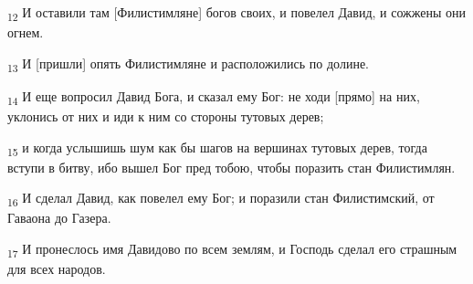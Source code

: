 \begin{tcolorbox}
\textsubscript{12} И оставили там [Филистимляне] богов своих, и повелел Давид, и сожжены они огнем.
\end{tcolorbox}
\begin{tcolorbox}
\textsubscript{13} И [пришли] опять Филистимляне и расположились по долине.
\end{tcolorbox}
\begin{tcolorbox}
\textsubscript{14} И еще вопросил Давид Бога, и сказал ему Бог: не ходи [прямо] на них, уклонись от них и иди к ним со стороны тутовых дерев;
\end{tcolorbox}
\begin{tcolorbox}
\textsubscript{15} и когда услышишь шум как бы шагов на вершинах тутовых дерев, тогда вступи в битву, ибо вышел Бог пред тобою, чтобы поразить стан Филистимлян.
\end{tcolorbox}
\begin{tcolorbox}
\textsubscript{16} И сделал Давид, как повелел ему Бог; и поразили стан Филистимский, от Гаваона до Газера.
\end{tcolorbox}
\begin{tcolorbox}
\textsubscript{17} И пронеслось имя Давидово по всем землям, и Господь сделал его страшным для всех народов.
\end{tcolorbox}
